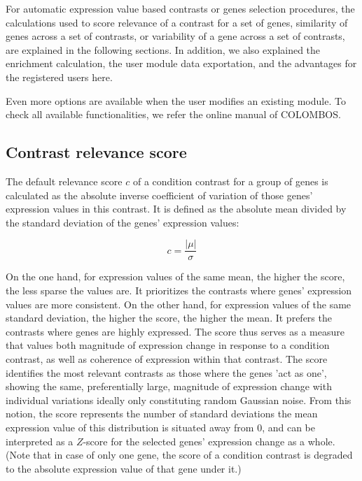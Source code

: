 For automatic expression value based contrasts or genes selection procedures, 
the calculations used to score relevance of a contrast for 
a set of genes, similarity of genes across a set of contrasts, or variability 
of a gene across a set of contrasts, are explained in the following sections.  
In addition, we also explained the enrichment calculation, the user module data 
exportation, and the advantages for the registered users here.

Even more options are available when the user modifies an existing 
module. To check all available functionalities, we refer the online manual of 
COLOMBOS.



\subsection{Contrast relevance score}\label{apd:contrast-score}

The default relevance score $c$ of a condition contrast for a group
of genes is calculated as the absolute inverse coefficient of
variation of those genes’ expression values in this contrast. It
is defined as the absolute mean divided by the standard deviation
of the genes’ expression values:

\begin{equation}
c=\frac{|\mu|}{\sigma}
\end{equation}
 
On the one hand, for expression values of the same mean, the
higher the score, the less sparse the values are. It prioritizes
the contrasts where genes’ expression values are more
consistent. On the other hand, for expression values of the same
standard deviation, the higher the score, the higher the mean. It
prefers the contrasts where genes are highly expressed. The score
thus serves as a measure that values both magnitude of expression
change in response to a condition contrast, as well as coherence
of expression within that contrast. The score identifies the most
relevant contrasts as those where the genes 'act as one', showing
the same, preferentially large, magnitude of expression change
with individual variations ideally only constituting random
Gaussian noise. From this notion, the score represents the number
of standard deviations the mean expression value of this
distribution is situated away from $0$, and can be interpreted as a
$Z$-score for the selected genes' expression change as a
whole. (Note that in case of only one gene, the score of a
condition contrast is degraded to the absolute expression value
of that gene under it.)

